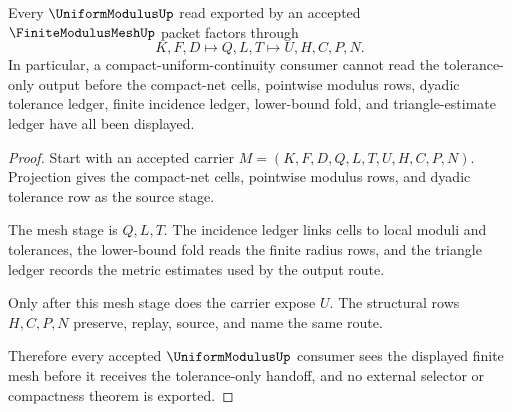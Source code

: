 \begin{theorem}
\label{thm:finite-modulus-mesh-uniform-handoff-route}
Every $\UniformModulusUp$ read exported by an accepted $\FiniteModulusMeshUp$ packet factors through
$$
K,F,D \longmapsto Q,L,T \longmapsto U,H,C,P,N .
$$
In particular, a compact-uniform-continuity consumer cannot read the tolerance-only output before the compact-net cells, pointwise modulus rows, dyadic tolerance ledger, finite incidence ledger, lower-bound fold, and triangle-estimate ledger have all been displayed.
\end{theorem}
\begin{proof}
Start with an accepted carrier $M=(K,F,D,Q,L,T,U,H,C,P,N)$. Projection gives the compact-net cells, pointwise modulus rows, and dyadic tolerance row as the source stage.

The mesh stage is $Q,L,T$. The incidence ledger links cells to local moduli and tolerances, the lower-bound fold reads the finite radius rows, and the triangle ledger records the metric estimates used by the output route.

Only after this mesh stage does the carrier expose $U$. The structural rows $H,C,P,N$ preserve, replay, source, and name the same route.

Therefore every accepted $\UniformModulusUp$ consumer sees the displayed finite mesh before it receives the tolerance-only handoff, and no external selector or compactness theorem is exported.
\end{proof}




